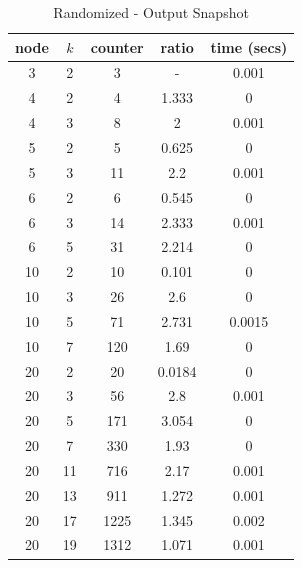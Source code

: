 \documentclass[longpaper, english, final, times]{revdetua}
\begin{document}
			\begin{table}[!h]
				{\renewcommand{\arraystretch}{1.2}
					\begin{tabular}{|c|c|c|c|c|}
						\hline
						node&$k$&counter&ratio&time (secs)\\
						\hline
						3	&2	&3	&-	&0.001\\
						\hline
						4	&2	&4	&1.333	&0\\
						4	&3	&8	&2	&0.001\\
						\hline
						5	&2	&5	&0.625	&0\\
						5	&3	&11&	2.2&	0.001\\
						\hline
						6	&2	&6	&0.545	&0\\
						6	&3	&14	&2.333	&0.001\\
						6	&5	&31	&2.214	&0\\
						\hline
						10	&2	&10	&0.101	&0\\
						10	&3	&26	&2.6	&0\\
						10	&5	&71	&2.731	&0.0015\\
						10	&7	&120&	1.69	&0\\
						\hline
						20	&2	&20	&0.0184	&0\\
						20	&3	&56	&2.8	&0.001\\
						20	&5	&171	&3.054	&0\\
						20	&7	&330	&1.93	&0\\
						20	&11	&716	&2.17	&0.001\\
						20	&13	&911	&1.272	&0.001\\
						20	&17	&1225	&1.345 &0.002\\
						20	&19	&1312	&1.071	&0.001\\
						\hline
					\end{tabular}
				}
				\caption{Randomized - Output Snapshot}
				\label{table:randomizedOutputSnapshot}
			\end{table}
		
	\newpage
\end{document}
